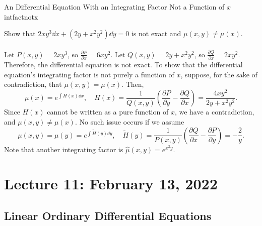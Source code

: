         \begin{example}{An Differential Equation With an Integrating Factor Not a Function of \(x\)}{intfactnotx}
            
            Show that \(2xy^3\dd x+(2y+x^2y^2)\dd y=0\) is not exact and \(\mu(x,y)\neq\mu(x)\).
            \\
            \\
            Let \(P(x,y)=2xy^3\), so \(\frac{\partial P}{\partial x}=6xy^2\). Let \(Q(x,y)=2y+x^2y^2\), so \(\frac{\partial Q}{\partial x}=2xy^2\). Therefore, the differential equation is not exact. To show that the differential equation's integrating factor is not purely a function of \(x\), suppose, for the sake of contradiction, that \(\mu(x,y)=\mu(x)\). Then,
            \begin{equation*}
                \mu(x)=e^{\int H(x)\dd x},\quad H(x)=\frac{1}{Q(x,y)}\left(\frac{\partial P}{\partial y}-\frac{\partial Q}{\partial x}\right)=\frac{4xy^2}{2y+x^2y^2}.
            \end{equation*}
            Since \(H(x)\) cannot be written as a pure function of \(x\), we have a contradiction, and \(\mu(x,y)\neq\mu(x)\). No such issue occurs if we assume 
            \begin{equation*}
                \mu(x,y)=\mu(y)=e^{\int \tilde{H}(y)\dd y}, \quad \tilde{H}(y)=\frac{1}{P(x,y)}\left(\frac{\partial Q}{\partial x}-\frac{\partial P}{\partial y}\right)=-\frac{2}{y}.
            \end{equation*}
            Note that another integrating factor is \(\hat{\mu}(x,y)=e^{x^2y}\).

        \end{example}

\pagebreak

\section{Lecture 11: February 13, 2022}

    \subsection{Linear Ordinary Differential Equations}

